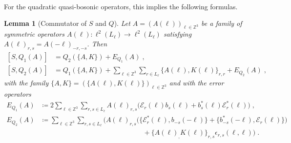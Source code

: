 \documentclass[12pt,a4paper]{article}
\numberwithin{equation}{section}
\newcommand{\1}{\mathbb{I}}
\newcommand{\Zstar}{\mathbb{Z}^3} %
\newcommand{\Z}{\mathbb{Z}}
\theoremstyle{plain}
\newtheorem{lemma}[theorem]{Lemma}
\theoremstyle{definition}
\theoremstyle{remark}
\theoremstyle{plain}
\theoremstyle{definition}
\theoremstyle{remark}
\begin{document}
For the quadratic quasi-bosonic operators, this implies the following formulas.

\begin{lemma}[Commutator of $S$ and $Q$]\label{lem:Q1Kcomm}
Let $ A = (A(\ell))_{\ell \in \Zstar} $ be a family of symmetric operators $ A(\ell) : \ell^2(L_\ell) \to \ell^2(L_\ell) $ satisfying $A(\ell)_{r,s} = A(-\ell)_{-r,-s}$. Then
\begin{equation}
\begin{aligned}
	[S, Q_1(A)] 
	&= Q_2(\{A,K\})
		+ E_{Q_1}(A) \;, \\
	[S, Q_2(A)] 
	&= Q_1\left(\{A,K\} \right) 
		+ \sum_{\ell \in \Zstar} \sum_{r \in L_{\ell}} \big\{ A(\ell), K(\ell) \big\}_{r,r}
		+ E_{Q_2}(A) \;,
\end{aligned}
\end{equation}
with the family $ \{A,K\} = (\{A(\ell),K(\ell)\})_{\ell \in \Zstar} $ and with the error operators
\begin{equation}\label{eq:errKQ}
\begin{aligned}
	E_{Q_1}(A)
	&\coloneq 2 \sum_{\ell \in \Zstar}\sum_{r,s \in L_{\ell}}A(\ell)_{r,s}\Big(\mathcal{E}_{r}(\ell)b_{s}(\ell) + b^*_{s}(\ell)\mathcal{E}^*_{r}(\ell)\Big) \;, \\
	E_{Q_2}(A)
	& \coloneq \sum_{\ell \in \Zstar}\sum_{r,s \in L_{\ell}}\Big(A(\ell)_{r,s}\big(\big\{\mathcal{E}^*_{r}(\ell), b_{-s}(-\ell)\big\}
		+ \big\{ b^*_{-s}(-\ell) , \mathcal{E}_r(\ell) \big\} \big) \\
		& \hspace{15em}
		+ \big\{A(\ell)_,K(\ell)\big\}_{r,s}\epsilon_{r,s}(\ell,\ell)\Big) \;. \\
\end{aligned} 
\end{equation}
\end{lemma}
\end{document}

